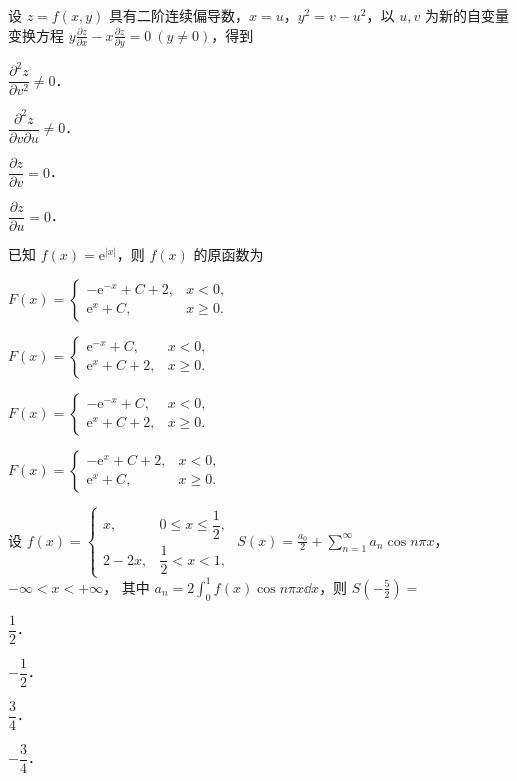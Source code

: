 
\begin{question}[index=1]
设 $z=f(x,y)$ 具有二阶连续偏导数，$x=u$，$y^2=v-u^2$，以 $u,v$ 为新的自变量变换方程
$\displaystyle y\frac{\partial z}{\partial x}-x\frac{\partial z}{\partial y}=0\ (y\ne0)$，得到
\begin{choices}[columns=4,label-pos=left]
\item $\dfrac{\partial^2 z}{\partial v^2}\ne0$．
\item $\dfrac{\partial^2 z}{\partial v\partial u}\ne0$．
\item $\dfrac{\partial z}{\partial v}=0$．
\item $\dfrac{\partial z}{\partial u}=0$．
\end{choices}
\end{question}
\QuestionBreak

\begin{question}[index=2]
已知 $f(x)=\mathrm e^{|x|}$，则 $f(x)$ 的原函数为
\begin{choices}[columns=2,label-pos=left]
\item $F(x)=\begin{cases}-\mathrm e^{-x}+C+2,&x<0,\\ \mathrm e^x+C,&x\ge0.\end{cases}$
\item $F(x)=\begin{cases}\mathrm e^{-x}+C,&x<0,\\ \mathrm e^x+C+2,&x\ge0.\end{cases}$
\item $F(x)=\begin{cases}-\mathrm e^{-x}+C,&x<0,\\ \mathrm e^x+C+2,&x\ge0.\end{cases}$
\item $F(x)=\begin{cases}-\mathrm e^x+C+2,&x<0,\\ \mathrm e^x+C,&x\ge0.\end{cases}$
\end{choices}
\end{question}
\QuestionBreak

\begin{question}[index=3]
设 $\displaystyle f(x)=\begin{cases}x,&0\le x\le\dfrac12,\\[3pt]2-2x,&\dfrac12<x<1,\end{cases}$
$\displaystyle S(x)=\frac{a_0}{2}+\sum_{n=1}^{\infty}a_n\cos n\pi x$，$-\infty<x<+\infty$，
其中 $\displaystyle a_n=2\int_0^1 f(x)\cos n\pi x\dd x$，则 $\displaystyle S\left(-\frac52\right)=$
\begin{choices}[columns=4,label-pos=left]
\item $\dfrac12$．
\item $-\dfrac12$．
\item $\dfrac34$．
\item $-\dfrac34$．
\end{choices}
\end{question}
\QuestionBreak

